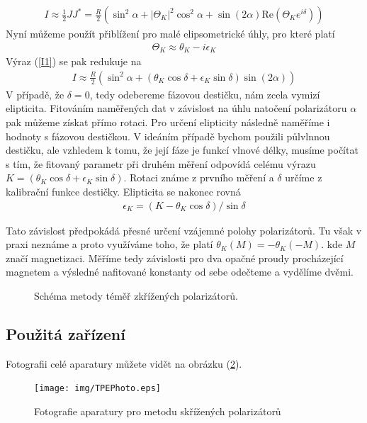 \begin{eqnarray}
I\approx\frac{1}{2}JJ^*=\frac{R}{2}(\sin^2\alpha+|\Theta_K|^2\cos^2\alpha+\sin(2\alpha)\mbox{Re}(\Theta_Ke^{i\delta}))
\label{I1}
\end{eqnarray}
Nyní můžeme použít přiblížení pro malé elipsometrické úhly, pro které platí
\begin{eqnarray}
\Theta_K\approx\theta_K-i\epsilon_K
\end{eqnarray}
Výraz (\ref{I1}) se pak redukuje na
\begin{eqnarray}
I\approx\frac{R}{2}(\sin^2\alpha+(\theta_K\cos\delta+\epsilon_K\sin\delta)\sin(2\alpha))
\label{I2}
\end{eqnarray}
V  případě, že $\delta=0$, tedy odebereme fázovou destičku, nám zcela vymizí elipticita. Fitováním naměřených dat v závislost na úhlu natočení polarizátoru $\alpha$ pak můžeme získat přímo rotaci. Pro určení elipticity následně naměříme i hodnoty s fázovou destičkou. V ideáním případě bychom použili půlvlnnou destičku, ale vzhledem k tomu, že její fáze je funkcí vlnové délky, musíme počítat s tím, že fitovaný parametr při druhém měření odpovídá celému výrazu $K=(\theta_K\cos\delta+\epsilon_K\sin\delta)$. Rotaci známe z prvního měření a $\delta$ určíme z kalibrační funkce destičky. Elipticita se nakonec rovná
\begin{eqnarray}
\epsilon_K=(K-\theta_K\cos\delta)/\sin\delta
\end{eqnarray}

Tato závislost předpokádá přesné určení vzájemné polohy polarizátorů. Tu však v praxi neznáme a proto využíváme toho, že platí $\theta_K(M)=-\theta_K(-M)$. kde $M$ značí magnetizaci. Měříme tedy závislosti pro dva opačné proudy procházející magnetem a výsledné nafitované konstanty od sebe odečteme a vydělíme dvěmi.

\begin{figure}
    \caption{Schéma metody téměř zkřížených polarizátorů.}
    \label{Schema TPE}
\end{figure}

\subsection{Použitá zařízení}
Fotografii celé aparatury můžete vidět na obrázku (\ref{TPE photo}).

\begin{figure}
\begin{center}
\texttt{[image: img/TPEPhoto.eps]}
\caption{Fotografie aparatury pro metodu skřížených polarizátorů}
\label{TPE photo}
\end{center}
\end{figure}

